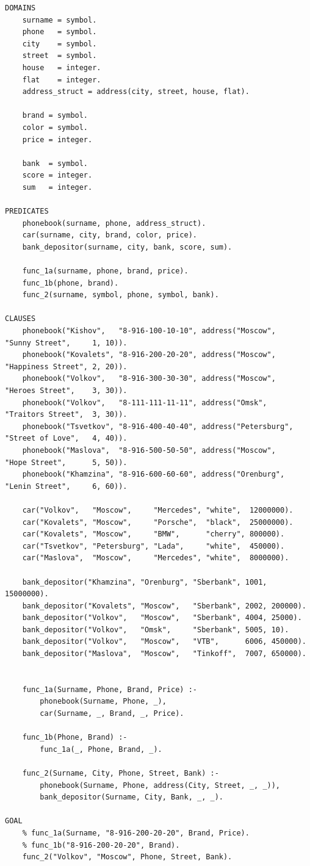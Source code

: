 \documentclass[a4paper,14pt, unknownkeysallowed]{extreport}
\begin{document}
\begin{center}
\captionsetup{justification=raggedright,singlelinecheck=off}
\begin{lstlisting}[label=lst:parallel_processing,caption=Решение задания 1]
DOMAINS 
	surname = symbol.
	phone   = symbol.
	city    = symbol. 
	street  = symbol.
	house   = integer.
	flat    = integer.
	address_struct = address(city, street, house, flat).

	brand = symbol.
	color = symbol.
	price = integer.
	
	bank  = symbol.
	score = integer.
	sum   = integer.

PREDICATES
	phonebook(surname, phone, address_struct).
	car(surname, city, brand, color, price).
	bank_depositor(surname, city, bank, score, sum).
	
	func_1a(surname, phone, brand, price).
	func_1b(phone, brand).
	func_2(surname, symbol, phone, symbol, bank).

CLAUSES
	phonebook("Kishov",   "8-916-100-10-10", address("Moscow",     "Sunny Street",     1, 10)).
	phonebook("Kovalets", "8-916-200-20-20", address("Moscow",     "Happiness Street", 2, 20)).
	phonebook("Volkov",   "8-916-300-30-30", address("Moscow",     "Heroes Street",    3, 30)).
	phonebook("Volkov",   "8-111-111-11-11", address("Omsk",       "Traitors Street",  3, 30)).
	phonebook("Tsvetkov", "8-916-400-40-40", address("Petersburg", "Street of Love",   4, 40)).
	phonebook("Maslova",  "8-916-500-50-50", address("Moscow",     "Hope Street",      5, 50)).
	phonebook("Khamzina", "8-916-600-60-60", address("Orenburg",   "Lenin Street",     6, 60)).
	
	car("Volkov",   "Moscow",     "Mercedes", "white",  12000000).
	car("Kovalets", "Moscow",     "Porsche",  "black",  25000000).
	car("Kovalets", "Moscow",     "BMW",      "cherry", 800000).
	car("Tsvetkov", "Petersburg", "Lada",     "white",  450000).
	car("Maslova",  "Moscow",     "Mercedes", "white",  8000000).
	
	bank_depositor("Khamzina", "Orenburg", "Sberbank", 1001, 15000000).
	bank_depositor("Kovalets", "Moscow",   "Sberbank", 2002, 200000).
	bank_depositor("Volkov",   "Moscow",   "Sberbank", 4004, 25000).
	bank_depositor("Volkov",   "Omsk",     "Sberbank", 5005, 10).
	bank_depositor("Volkov",   "Moscow",   "VTB",      6006, 450000).
	bank_depositor("Maslova",  "Moscow",   "Tinkoff",  7007, 650000).
	
	
	func_1a(Surname, Phone, Brand, Price) :-  
		phonebook(Surname, Phone, _),
		car(Surname, _, Brand, _, Price). 
		
	func_1b(Phone, Brand) :- 
		func_1a(_, Phone, Brand, _).
	
	func_2(Surname, City, Phone, Street, Bank) :- 
		phonebook(Surname, Phone, address(City, Street, _, _)), 
		bank_depositor(Surname, City, Bank, _, _).
	
GOAL
	% func_1a(Surname, "8-916-200-20-20", Brand, Price).
	% func_1b("8-916-200-20-20", Brand).
	func_2("Volkov", "Moscow", Phone, Street, Bank).
\end{lstlisting}
\end{center}
\end{document}
